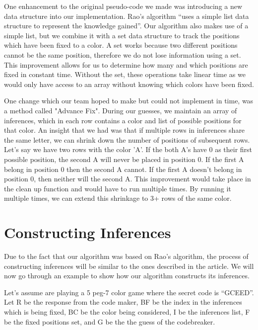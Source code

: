 \documentclass[11pt]{article}
\begin{document}
    One enhancement to the original pseudo-code we made was introducing a new data structure into our implementation. Rao's algorithm \enquote{uses a simple list data structure to represent the knowledge gained}\autocite{rao}. Our algorithm also makes use of a simple list, but we combine it with a set data structure to track the positions which have been fixed to a color. A set works because two different positions cannot be the same position, therefore we do not lose information using a set. This improvement allows for us to determine how many and which positions are fixed in constant time. Without the set, these operations take linear time as we would only have access to an array without knowing which colors have been fixed. 
    
    One change which our team hoped to make but could not implement in time, was a method called "Advance Fix". During our guesses, we maintain an array of inferences, which in each row contains a color and list of possible positions for that color. An insight that we had was that if multiple rows in inferences share the same letter, we can shrink down the number of positions of subsequent rows. Let's say we have two rows with the color 'A'. If the both A's have 0 as their first possible position, the second A will never be placed in position 0. If the first A belong in position 0 then the second A cannot. If the first A doesn't belong in position 0, then neither will the second A. This improvement would take place in the clean up function and would have to run multiple times. By running it multiple times, we can extend this shrinkage to 3+ rows of the same color.
    
    \section{Constructing Inferences}
    Due to the fact that our algorithm was based on Rao's algorithm, the process of constructing inferences will be similar to the ones described in the article\autocite{rao}. We will now go through an example to show how our algorithm constructs its inferences.

    Let's assume are playing a 5 peg-7 color game where the secret code is \enquote{GCEED}. Let R be the response from the code maker, BF be the index in the inferences which is being fixed, BC be the color being considered, I be the inferences list, F be the fixed positions set, and G be the the guess of the codebreaker.\\
\end{document}
